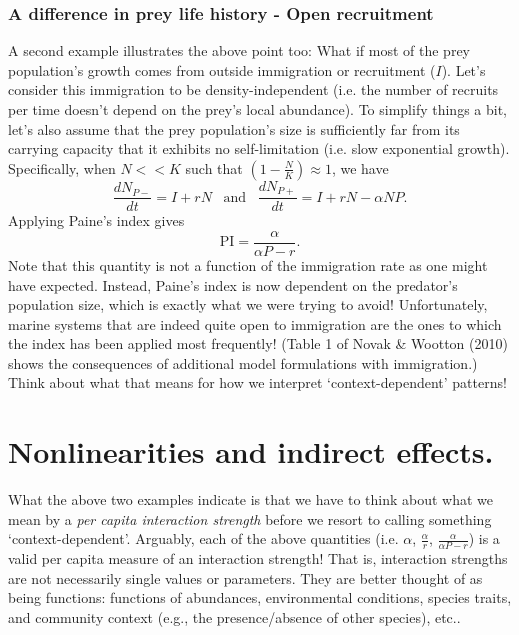 \documentclass[10pt,letterpaper]{article}
\begin{document}
\subsubsection{A difference in prey life history - Open recruitment}
A second example illustrates the above point too: What if most of the prey population's growth comes from outside immigration or recruitment ($I$).  Let's consider this immigration to be density-independent (i.e. the number of recruits per time doesn't depend on the prey's local abundance).  To simplify things a bit, let's also assume that the prey population's size is sufficiently far from its carrying capacity that it exhibits no self-limitation (i.e. slow exponential growth).  Specifically, when $N<<K$ such that $\left(1-\tfrac{N}{K}\right)\approx 1$, we have
\begin{equation}
	\frac{d N_{P-}}{d t} = I + rN
\;\;\; \text{and} \;\;\;
\frac{d N_{P+}}{d t} = I + rN  - \alpha NP.
\end{equation}
Applying Paine's index gives
\begin{equation}
\text{PI}=\frac{\alpha}{\alpha P-r}.
\end{equation}
Note that this quantity is not a function of the immigration rate as one might have expected. Instead, Paine's index is now dependent on the predator's population size, which is exactly what we were trying to avoid!  Unfortunately, marine systems that are indeed quite open to immigration are the ones to which the index has been applied most frequently! (Table 1 of Novak \& Wootton (2010) shows the consequences of additional model formulations with immigration.)  Think about what that means for how we interpret `context-dependent' patterns!



\section{Nonlinearities and indirect effects.}
What the above two examples indicate is that we have to think about what we mean by a \emph{per capita interaction strength} before we resort to calling something `context-dependent'.  Arguably, each of the above quantities (i.e. $\alpha$, $\tfrac{\alpha}{r}$, $\tfrac{\alpha}{\alpha P-r}$) is a valid per capita measure of an interaction strength!  That is, interaction strengths are not necessarily single values or parameters.  They are better thought of as being functions: functions of abundances, environmental conditions, species traits, and community context (e.g., the presence/absence of other species), etc..
\end{document}

